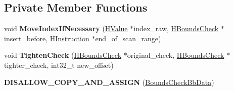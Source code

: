 \subsection*{Private Member Functions}
\begin{DoxyCompactItemize}
\item 
void {\bfseries Move\+Index\+If\+Necessary} (\hyperlink{classv8_1_1internal_1_1_h_value}{H\+Value} $\ast$index\+\_\+raw, \hyperlink{classv8_1_1internal_1_1_h_bounds_check}{H\+Bounds\+Check} $\ast$insert\+\_\+before, \hyperlink{classv8_1_1internal_1_1_h_instruction}{H\+Instruction} $\ast$end\+\_\+of\+\_\+scan\+\_\+range)\hypertarget{classv8_1_1internal_1_1_bounds_check_bb_data_ad843ffb3b1cce61ae1efc00fef311506}{}\label{classv8_1_1internal_1_1_bounds_check_bb_data_ad843ffb3b1cce61ae1efc00fef311506}

\item 
void {\bfseries Tighten\+Check} (\hyperlink{classv8_1_1internal_1_1_h_bounds_check}{H\+Bounds\+Check} $\ast$original\+\_\+check, \hyperlink{classv8_1_1internal_1_1_h_bounds_check}{H\+Bounds\+Check} $\ast$tighter\+\_\+check, int32\+\_\+t new\+\_\+offset)\hypertarget{classv8_1_1internal_1_1_bounds_check_bb_data_ab18fa88fdf459984bf0b8d70d30b194f}{}\label{classv8_1_1internal_1_1_bounds_check_bb_data_ab18fa88fdf459984bf0b8d70d30b194f}

\item 
{\bfseries D\+I\+S\+A\+L\+L\+O\+W\+\_\+\+C\+O\+P\+Y\+\_\+\+A\+N\+D\+\_\+\+A\+S\+S\+I\+GN} (\hyperlink{classv8_1_1internal_1_1_bounds_check_bb_data}{Bounds\+Check\+Bb\+Data})\hypertarget{classv8_1_1internal_1_1_bounds_check_bb_data_a9a19d9801e9aca934685cff1e4982992}{}\label{classv8_1_1internal_1_1_bounds_check_bb_data_a9a19d9801e9aca934685cff1e4982992}

\end{DoxyCompactItemize}

